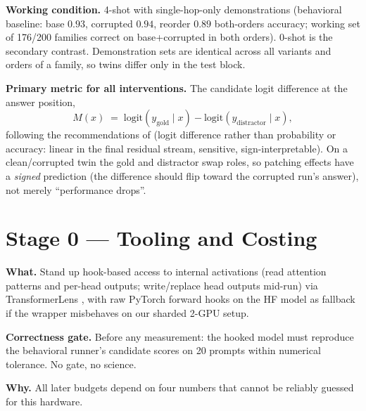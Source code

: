\documentclass[11pt,a4paper]{article}
\begin{document}
\textbf{Working condition.} 4-shot with single-hop-only demonstrations (behavioral baseline: base $0.93$, corrupted $0.94$, reorder $0.89$ both-orders accuracy; working set of 176/200 families correct on base+corrupted in both orders). 0-shot is the secondary contrast. Demonstration sets are identical across all variants and orders of a family, so twins differ only in the test block.

\textbf{Primary metric for all interventions.} The candidate logit difference at the answer position,
\begin{equation}
M(x) \;=\; \mathrm{logit}\!\left(y_{\text{gold}}\mid x\right) - \mathrm{logit}\!\left(y_{\text{distractor}}\mid x\right),
\end{equation}
following the recommendations of \cite{bestpractices} (logit difference rather than probability or accuracy: linear in the final residual stream, sensitive, sign-interpretable). On a clean/corrupted twin the gold and distractor swap roles, so patching effects have a \emph{signed} prediction (the difference should flip toward the corrupted run's answer), not merely ``performance drops''.

\section{Stage 0 --- Tooling and Costing}
\textbf{What.} Stand up hook-based access to internal activations (read attention patterns and per-head outputs; write/replace head outputs mid-run) via TransformerLens \cite{tlens}, with raw PyTorch forward hooks on the HF model as fallback if the wrapper misbehaves on our sharded 2-GPU setup.

\textbf{Correctness gate.} Before any measurement: the hooked model must reproduce the behavioral runner's candidate scores on 20 prompts within numerical tolerance. No gate, no science.

\textbf{Why.} All later budgets depend on four numbers that cannot be reliably guessed for this hardware.
\end{document}

